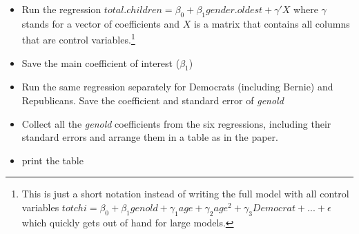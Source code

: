 \documentclass[]{article}
\providecommand{\tightlist}{%
  \setlength{\itemsep}{0pt}\setlength{\parskip}{0pt}}
\begin{document}
\begin{itemize}
\tightlist
\item
  Run the regression
  \(total.children = \beta_0 + \beta_1 gender.oldest + \gamma'X\) where
  \(\gamma\) stands for a vector of coefficients and \(X\) is a matrix
  that contains all columns that are control
  variables.\footnote{This is just a short notation instead of writing the full model with all control variables $totchi = \beta_0 + \beta_1 genold + \gamma_1 age + \gamma_2 age^2 + \gamma_3 Democrat + ... + \epsilon$ which quickly gets out of hand for large models.}
\item
  Save the main coefficient of interest (\(\beta_1\))
\item
  Run the same regression separately for Democrats (including Bernie)
  and Republicans. Save the coefficient and standard error of
  \emph{genold}
\item
  Collect all the \emph{genold} coefficients from the six regressions,
  including their standard errors and arrange them in a table as in the
  paper.
\item
  print the table
\end{itemize}
\end{document}

